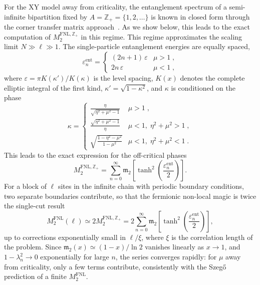 \documentclass[prx,twocolumn,superscriptaddress,aps,10pt, frontmatterverbose, reprint,footinbib,longbibliography=true]{revtex4-2}
\begin{document}
For the XY model away from criticality, the entanglement spectrum of a semi-infinite bipartition fixed by $A=\mathbb{Z}_+=\{1,2,\dots\}$ is known in closed form through the corner transfer matrix approach~\cite{Peschel2009,Eisler2017}.
As we show below, this leads to the exact computation of $M_2^\mathrm{FNL,\mathbb{Z}_+}$ in this regime. 
This regime approximates the scaling limit $N\gg\ell\gg1$.
The single-particle entanglement energies are equally spaced,
\begin{equation}
    \varepsilon_n^{\mathrm{ent}} = \begin{cases}
        (2n+1)\,\varepsilon & \mu > 1 \;,\\
        2n\,\varepsilon & \mu < 1 \;,
    \end{cases}
    \label{eq:peschel_spectrum}
\end{equation}
where $\varepsilon = \pi K(\kappa')/K(\kappa)$ is the level spacing, $K(x)$ denotes the complete elliptic integral of the first kind, $\kappa' = \sqrt{1-\kappa^2}$, and $\kappa$ is conditioned on the phase~\cite{Peschel2009}
\begin{equation}
    \kappa = \begin{cases}
        \displaystyle\frac{\eta}{\sqrt{\eta^2 + \mu^2 - 1}} & \mu > 1 \;,\\[8pt]
        \displaystyle\frac{\sqrt{\eta^2 + \mu^2 - 1}}{\eta} & \mu < 1,\; \eta^2 + \mu^2 > 1\;,\\[8pt]
        \displaystyle\sqrt{\frac{1 - \eta^2 - \mu^2}{1 - \mu^2}} & \mu < 1,\; \eta^2 + \mu^2 < 1\;.
    \end{cases}
    \label{eq:elliptic_modulus}
\end{equation}
This leads to the exact expression for the off-critical phases
\begin{equation}
    M_2^{\mathrm{FNL},\mathbb{Z}_+} = \sum_{n=0}^{\infty} \mathfrak{m}_2\!\left[\tanh^2\left(\frac{\varepsilon_n^{\mathrm{ent}}}{2}\right)\right].
    \label{eq:NL_peschel}
\end{equation}
For a block of $\ell$ sites in the infinite chain with periodic boundary conditions, two separate boundaries contribute, so that the fermionic non-local magic is twice the single-cut result
\begin{equation}
    M_2^{\mathrm{FNL}}(\ell) \simeq  2M_2^{\mathrm{FNL},\mathbb{Z}_+} = 2\sum_{n=0}^{\infty} \mathfrak{m}_2\!\left[\tanh^2\left(\frac{\varepsilon_n^{\mathrm{ent}}}{2}\right)\right],
    \label{eq:NL_peschel2}
\end{equation}
up to corrections exponentially small in $\ell/\xi$, where $\xi$ is the correlation length of the problem. 
Since $\mathfrak{m}_2(x)\simeq(1-x)/\ln 2$ vanishes linearly as $x \to 1$, and $1-\lambda_n^2 \to 0$ exponentially for large $n$, the series converges rapidly: for $\mu$ away from criticality, only a few terms contribute, consistently with the Szeg\H{o} prediction of a finite $M_2^{\mathrm{FNL}}$.
\end{document}
